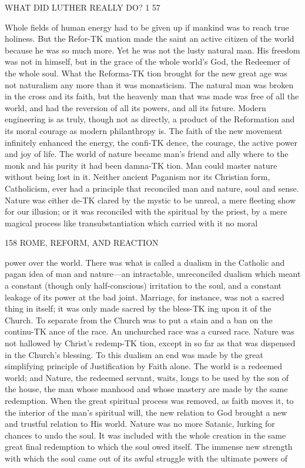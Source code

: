 \documentclass[12pt,a5paper,oneside]{book}
\begin{document}
{WHAT DID LUTHER REALLY DO? 1 57 

Whole fields of human energy had to be given up if 
mankind was to reach true holiness. But the Refor-TK
mation made the saint an active citizen of the world 
because he was so much more. Yet he was not the 
lusty natural man. His freedom was not in himself, 
but in the grace of the whole world's God, the 
Redeemer of the whole soul. What the Reforma-TK
tion brought for the new great age was not naturalism 
any more than it was monasticism. The natural man 
was broken in the cross and its faith, but the heavenly 
man that was made was free of all the world, and had 
the reversion of all its powers, and all its future. 
Modern engineering is as truly, though not as directly, 
a product of the Reformation and its moral courage 
as modern philanthropy is. The faith of the new 
movement infinitely enhanced the energy, the confi-TK
dence, the courage, the active power and joy of life. 
The world of nature became man's friend and ally 
where to the monk and his purity it had been damna-TK
tion. Man could master nature without being lost in 
it. Neither ancient Paganism nor its Christian form, 
Catholicism, ever had a principle that reconciled man 
and nature, soul and sense. Nature was either de-TK
clared by the mystic to be unreal, a mere fleeting 
show for our illusion; or it was reconciled with the 
spiritual by the priest, by a mere magical process like 
transubstantiation which carried with it no moral 



158 ROME, REFORM, AND REACTION 

power over the world. There was what is called a 
dualism in the Catholic and pagan idea of man and 
nature---an intractable, unreconciled dualism which 
meant a constant (though only half-conscious) irritation 
to the soul, and a constant leakage of its power at the 
bad joint. Marriage, for instance, was not a sacred 
thing in itself; it was only made sacred by the bless-TK
ing upon it of the Church. To separate from the 
Church was to put a stain and a ban on the continu-TK
ance of the race. An unchurched race was a cursed 
race. Nature was not hallowed by Christ's redemp-TK
tion, except in so far as that was dispensed in the 
Church's blessing. To this dualism an end was made 
by the great simplifying principle of Justification by 
Faith alone. The world is a redeemed world; and 
Nature, the redeemed servant, waits, longs to be used 
by the son of the house, the man whose manhood 
and whose mastery are made by the same redemption. 
When the great spiritual process was removed, as 
faith moves it, to the interior of the man's spiritual 
will, the new relation to God brought a new and 
trustful relation to His world. Nature was no more 
Satanic, lurking for chances to undo the soul. It was 
included with the whole creation in the same great 
final redemption to which the soul owed itself. The 
immense new strength with which the soul came out 
of its awful struggle with the ultimate powers of 



}
\end{document}
